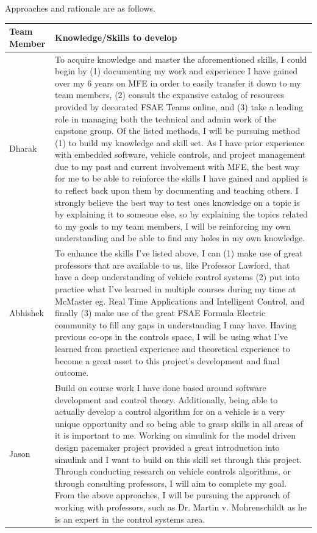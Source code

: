 \documentclass[12pt]{article}
\begin{document}
\newpage
Approaches and rationale are as follows.\\

\vspace{5mm}
\noindent
\begin{tabular}{| p{} | p{}|}
    \hline
    \rowcolor[gray]{0.9}
    Team Member & Knowledge/Skills to develop  \\
    \hline
    Dharak & To acquire knowledge and master the aforementioned skills, I could begin by (1) documenting my work and experience I have gained over my 6 years on MFE in order to easily transfer it down to my team members, (2) consult the expansive 
    catalog of resources provided by decorated FSAE Teams online, and (3) take a leading role in managing both the technical and admin work of the capstone group. Of the listed methods, I will be pursuing method (1) to build my knowledge and skill 
    set. As I have prior experience with embedded software, vehicle controls, and project management due to my past and current involvement with MFE, the best way for me to be able to reinforce the skills I have gained and applied is to reflect back
     upon them by documenting and teaching others. I strongly believe the best way to test ones knowledge on a topic is by explaining it to someone else, so by explaining the topics related to my goals to my team members, I will be reinforcing my own 
     understanding and be able to find any holes in my own knowledge.\\
    \hline
    Abhishek & To enhance the skills I've listed above, I can (1) make use of great professors that are available to us, like Professor Lawford, that have a deep understanding of vehicle control systems (2) put into practice what I've learned in 
    multiple courses during my time at McMaster eg. Real Time Applications and Intelligent Control, and finally (3) make use of the great FSAE Formula Electric community to fill any gaps in understanding I may have. Having previous co-ops in the 
    controls space, I will be using what I've learned from practical experience and theoretical experience to become a great asset to this project's development and final outcome. \\
    \hline
    Jason & Build on course work I have done based around software development and control theory. Additionally, being able to actually develop a control algorithm for on a vehicle is a very unique opportunity and so being able to grasp skills in
     all areas of it is important to me. Working on simulink for the model driven design pacemaker project provided a great introduction into simulink and I want to build on this skill set through this project. Through conducting research on vehicle
      controls algorithms, or through consulting professors, I will aim to complete my goal. From the above approaches, I will be pursuing the approach of working with professors, such as Dr. Martin v. Mohrenschildt as he is an expert in the control 
      systems area.\\
    \hline
\end{tabular}
\end{document}
